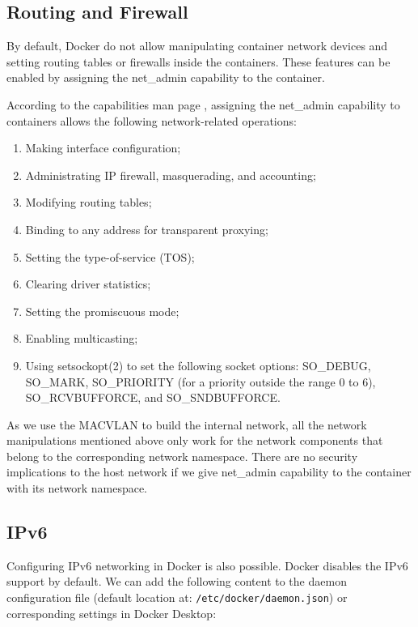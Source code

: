 \documentclass[article]{aaltoseries}
\begin{document}
\subsection{Routing and Firewall}

By default, Docker do not allow manipulating container network devices and setting routing tables or firewalls inside the containers. These features can be enabled by assigning the net\_admin capability to the container.

According to the capabilities man page \cite{capabilities}, assigning the net\_admin capability to containers allows the following network-related operations:
\begin{enumerate}
\setlength{\itemsep}{0pt}
\setlength{\parsep}{0pt}
\setlength{\parskip}{0pt}
\item Making interface configuration;
\item Administrating IP firewall, masquerading, and accounting;
\item Modifying routing tables;
\item Binding to any address for transparent proxying;
\item Setting the type-of-service (TOS);
\item Clearing driver statistics;
\item Setting the promiscuous mode;
\item Enabling multicasting;
\item Using setsockopt(2) to set the following socket options:
SO\_DEBUG, SO\_MARK, SO\_PRIORITY (for a priority outside the
range 0 to 6), SO\_RCVBUFFORCE, and SO\_SNDBUFFORCE.
\end{enumerate}

As we use the MACVLAN to build the internal network, all the network manipulations mentioned above only work for the network components that belong to the corresponding network namespace. There are no security implications to the host network if we give net\_admin capability to the container with its network namespace.

\subsection{IPv6}
Configuring IPv6 networking in Docker \cite{docker_documentation_ipv6_2023} is also possible. Docker disables the IPv6 support by default. We can add the following content to the daemon configuration file (default location at: \texttt{/etc/docker/daemon.json}) or corresponding settings in Docker Desktop:
\end{document}
